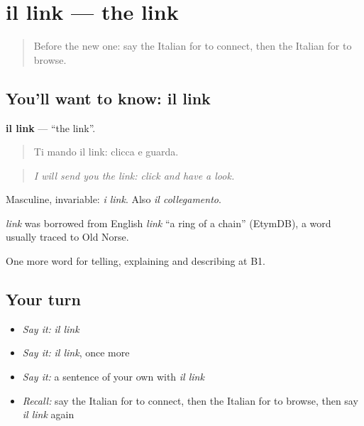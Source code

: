 \section[il link]{il link — the link}

\label{lesson:IT-C402-link}



\begin{quote}
Before the new one: say the Italian for to connect, then the Italian for to browse.
\end{quote}

\subsection*{You'll want to know: il link}
\textbf{il link} — \textquotedblleft{}the link\textquotedblright{}.

\begin{quote}
Ti mando il link: clicca e guarda.
\end{quote}

\begin{quote}
\emph{I will send you the link: click and have a look.}
\end{quote}

Masculine, invariable: \emph{i link}. Also \emph{il collegamento}.

\begin{cousinweb}
\emph{link} was borrowed from English \emph{link} \textquotedblleft{}a ring of a chain\textquotedblright{} (EtymDB), a word usually traced to Old Norse.
\end{cousinweb}

\begin{grammarlens}[title={What you've built}]
One more word for telling, explaining and describing at B1.
\end{grammarlens}

\subsection*{Your turn}
\begin{itemize}
\raggedright
  \item \emph{Say it:} \emph{il link}
  \item \emph{Say it:} \emph{il link}, once more
  \item \emph{Say it:} a sentence of your own with \emph{il link}
  \item \emph{Recall:} say the Italian for to connect, then the Italian for to browse, then say \emph{il link} again
\end{itemize}

